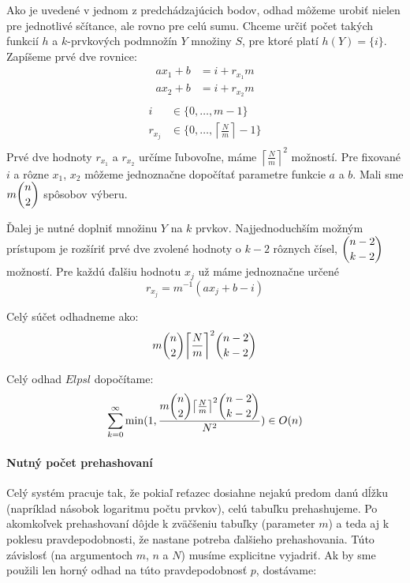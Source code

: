 Ako je uvedené v jednom z predchádzajúcich bodov, odhad môžeme urobiť nielen pre jednotlivé sčítance, ale rovno pre celú sumu. Chceme určiť počet takých funkcií $h$ a $k$-prvkových podmnožín $Y$ množiny $S$, pre ktoré platí $h(Y) = \{i\}$. Zapíšeme prvé dve rovnice:
\begin{displaymath}
\begin{split}
ax_1 + b & = i + r_{x_1} m \\
ax_2 + b & = i + r_{x_2} m \\
\end{split}
\end{displaymath}
\begin{displaymath}
\begin{split}
i & \in \{0, \dots, m-1\} \\
r_{x_j} & \in \{ 0, \dots, \left\lceil \frac{N}{m} \right\rceil - 1\} \\
\end{split}
\end{displaymath}
Prvé dve hodnoty $r_{x_1}$ a $r_{x_2}$ určíme ľubovoľne, máme ${\left\lceil \frac{N}{m} \right\rceil}^2$ možností. Pre fixované $i$ a rôzne $x_1$, $x_2$ môžeme jednoznačne dopočítať parametre funkcie $a$ a $b$. Mali sme $m \dbinom{n}{2}$ spôsobov výberu. 

Ďalej je nutné doplniť množinu $Y$ na $k$ prvkov. Najjednoduchším možným prí\-stu\-pom je rozšíriť prvé dve zvolené hodnoty o $k-2$ rôznych čísel, $\dbinom{n-2}{k-2}$ možností. Pre každú ďalšiu hodnotu $x_j$ už máme jednoznačne určené 
\begin{displaymath}
r_{x_j} = m^{-1}(a x_j + b - i)
\end{displaymath}

Celý súčet odhadneme ako:
\begin{displaymath}
m\dbinom{n}{2}{\left\lceil \frac{N}{m} \right\rceil}^2 \dbinom{n-2}{k-2}
\end{displaymath}

Celý odhad $E lpsl$ dopočítame:
\begin{displaymath}
\sum_{k=0}^{\infty} \min(1, \frac{m\dbinom{n}{2}{\left\lceil \frac{N}{m} \right\rceil}^2 \dbinom{n-2}{k-2}}{N^2}) \in O(n)
\end{displaymath}

\paragraph{Nutný počet prehashovaní}

Celý systém pracuje tak, že pokiaľ reťazec dosiahne nejakú predom danú dĺžku (napríklad násobok logaritmu počtu prvkov), celú tabuľku prehashujeme. Po akomkoľvek prehashovaní dôjde k zväčšeniu tabuľky (parameter $m$) a teda aj k poklesu pravdepodobnosti, že nastane potreba ďalšieho prehashovania. Túto závislosť (na argumentoch $m$, $n$ a $N$) musíme explicitne vyjadriť. Ak by sme použili len horný odhad na túto pravdepodobnosť $p$, dostávame:

